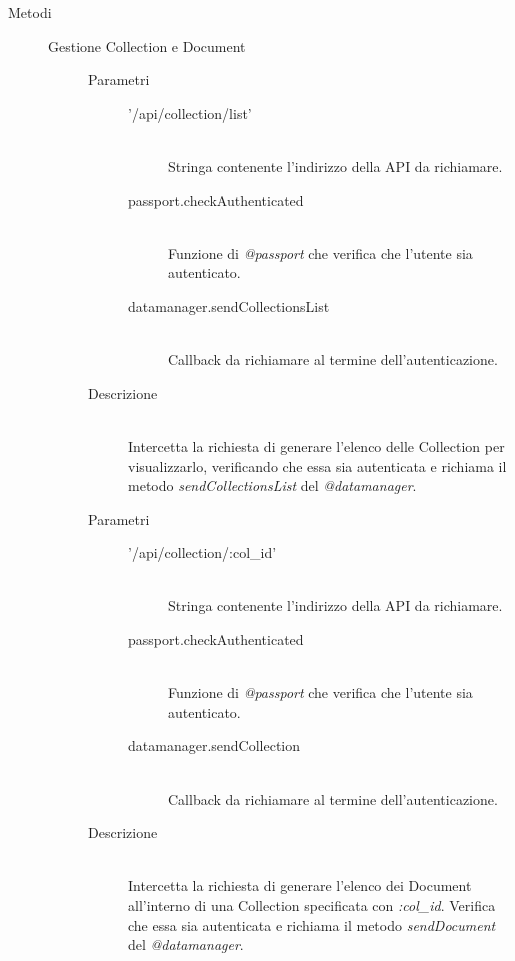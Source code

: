 \begin{description}
 \item[Metodi] \hfill
 \begin{description}
 \item[Gestione Collection e Document]
 \begin{mldescription}
   \hfill
  \begin{description}
   \item[Parametri] \hfill 
    \begin{description}
     \item['/api/collection/list'] \hfill \\
     Stringa contenente l'indirizzo della API da richiamare.
     \item[passport.checkAuthenticated] \hfill \\
     Funzione di \textit{@passport} che verifica che l'utente sia autenticato.
     \item[datamanager.sendCollectionsList] \hfill \\
     Callback da richiamare al termine dell'autenticazione.
    \end{description}
   \item[Descrizione] \hfill \\
   Intercetta la richiesta di generare l'elenco delle Collection per visualizzarlo, verificando che essa sia autenticata e richiama il metodo \textit{sendCollectionsList} del \textit{@datamanager}.
  \end{description}
  
  \hfill 
  \begin{description}
   \item[Parametri] \hfill 
    \begin{description}
     \item['/api/collection/:col\_id'] \hfill \\
     Stringa contenente l'indirizzo della API da richiamare.
     \item[passport.checkAuthenticated] \hfill \\
     Funzione di \textit{@passport} che verifica che l'utente sia autenticato.
     \item[datamanager.sendCollection] \hfill \\
     Callback da richiamare al termine dell'autenticazione.
    \end{description}
   \item[Descrizione] \hfill \\
  Intercetta la richiesta di generare l'elenco dei Document all'interno di una Collection specificata con \textit{:col\_id}. Verifica che essa sia autenticata e richiama il metodo \textit{sendDocument} del \textit{@datamanager}.
  \end{description}
  

\end{mldescription}
\end{description}
\end{description}

